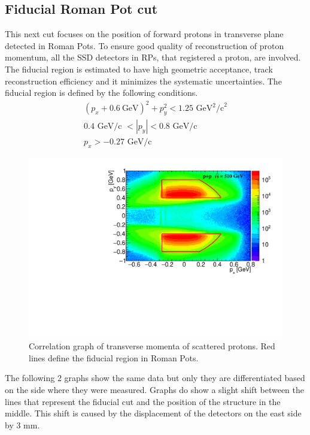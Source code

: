 \subsection{Fiducial Roman Pot cut}
This next cut focuses on the position of forward protons in transverse plane detected in Roman Pots. To ensure good quality of reconstruction of proton momentum, all the SSD detectors in RPs, that registered a proton, are involved. The fiducial region is estimated to have high geometric acceptance, track reconstruction efficiency and it minimizes the systematic uncertainties\cite{Truhlar}. The fiducial region is defined by the following conditions.
\begin{gather*}  
(p_x + 0.6~\textrm{GeV})^2 + p_y^2 < 1.25 \textrm{ GeV}^2\textrm{/c}^2 \\
0.4 \textrm{ GeV/c } < |p_y| < 0.8 \textrm{ GeV/c} \\
p_x > -0.27 \textrm{ GeV/c}
\label{ea1}
\end{gather*}
\FloatBarrier
\begin{figure}[ht]
    \centering
    \includegraphics[width=1\textwidth]{figures/hRPcorr.pdf}
    \caption[Correlation graph of transverse momentum in Roman Pot system]{Correlation graph of transverse momenta of scattered protons. Red lines define the fiducial region in Roman Pots.}
    \label{af3}
\end{figure}
\FloatBarrier
The following 2 graphs show the same data but only they are differentiated based on the side where they were measured. Graphs do show a slight shift between the lines that represent the fiducial cut and the position of the structure in the middle. This shift is caused by the displacement of the detectors on the east side by 3 mm. 

